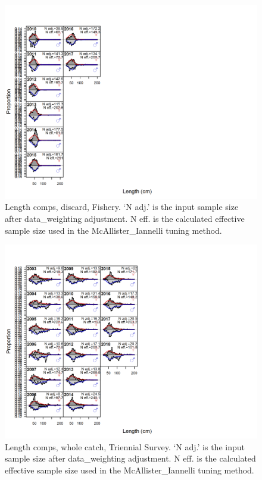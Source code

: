 \documentclass[12pt,]{article}
\begin{document}
\begin{figure}
\centering
\includegraphics{./r4ss/plots_mod1/comp_lenfit_flt1mkt1.png}
\caption{Length comps, discard, Fishery. `N adj.' is the input sample
size after data\_weighting adjustment. N eff. is the calculated
effective sample size used in the McAllister\_Iannelli tuning method.
\label{fig:mod1_2_comp_lenfit_flt1mkt1}}
\end{figure}

\begin{figure}
\centering
\includegraphics{./r4ss/plots_mod1/comp_lenfit_flt5mkt0.png}
\caption{Length comps, whole catch, Triennial Survey. `N adj.' is the
input sample size after data\_weighting adjustment. N eff. is the
calculated effective sample size used in the McAllister\_Iannelli tuning
method. \label{fig:mod1_3_comp_lenfit_flt5mkt0}}
\end{figure}
\end{document}
